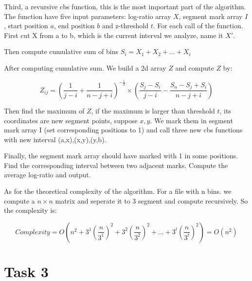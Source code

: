 \documentclass[a4paper]{article}
\begin{document}
Third, a revursive cbs function, this is the most important part of the algorithm. The function have five input parameters: log-ratio array $X$, segment mark array $I$, start position $a$, end position $b$ and z-threshold $t$. For each call of the function. First cut X from a to b, which is the current interval we analyze, name it $X'$. 

Then compute cumulative sum of bins $S_i = X_1+X_2+...+X_i$

After computing cumulative sum. We build a 2d array $Z$ and compute $Z$ by:

\begin{equation*}
Z_{ij}=(\frac{1}{j-i}+\frac{1}{n-j+i})^{-\frac{1}{2}}\times (\frac{S_j-S_i}{j-i}-\frac{S_n-S_j+S_i}{n-j+i})
\end{equation*}

Then find the maximum of $Z$, if the maximum is larger than threshold $t$, its coordinates are new segment points, suppose $x,y$. We mark them in segment mark array I (set corresponding positions to 1) and call three new cbs functions with new interval (a,x),(x,y),(y,b).

Finally, the segment mark array should have marked with 1 in some positions. Find the corresponding interval between two adjacent marks. Compute the average log-ratio and output.

As for the theoretical complexity of the algorithm. For a file with n bins. we compute a $n\times n$ matrix and seperate it to 3 segment and compute recursively. So the complexity is:

\begin{equation*}
Complexity = O(n^2 + 3^{1}(\frac{n}{3^{1}})^2 + 3^{2}(\frac{n}{3^{2}})^2+...+3^{t}(\frac{n}{3^{t}})^2)=O(n^2)
\end{equation*}

\section{Task 3}




\end{document}
